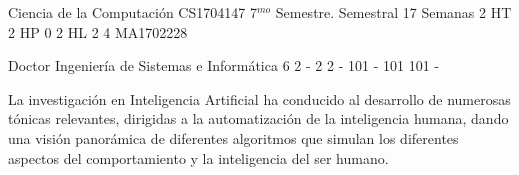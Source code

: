 \documentclass[a4paper,8pt]{article}
\begin{document}
\setNombreProfesor{}
\setGradoProfesorAbreviado{}
\sylabusHeader

\academicaTable
{Ciencia de la Computación} %
{CS1704147} %
{7$^{mo}$ Semestre.} %
{Semestral} %
{17 Semanas} %
{2 HT} %
{2 HP} %
{0} %
{2 HL}  %
{2} %
{4} %
{MA1702228} %

\administrativaTable
{Doctor} %
{Ingeniería de Sistemas e Informática} %
{6} %
{2} %
{-} %
{2} %
{2} %
{-} %
{101} %
{-} %
{101} %
{101} %
{-} %


\begin{fundamentacion}
La investigación en Inteligencia Artificial ha conducido al desarrollo de
numerosas tónicas relevantes, dirigidas a la automatización de la
inteligencia humana, dando una visión panorámica de diferentes
algoritmos que simulan los diferentes aspectos del comportamiento
y la inteligencia del ser humano.

\end{fundamentacion}

\begin{sumilla}
\item \ISFundamentalIssues
\item \ISBasicSearchStrategies
\item \ISBasicKnowledgeRepresentationandReasoning
\item \ISAdvancedSearch
\item \ISAdvancedRepresentationandReasoning
\item \ISAgents
\item \ISNaturalLanguageProcessing
\item \ISBasicMachineLearning
\item \ISRobotics
\item \ISPerceptionandComputerVision

\end{sumilla}

\begin{competenciasAsignatura}
\item {}
\item {}
\item {}

\end{competenciasAsignatura}
\end{document}
